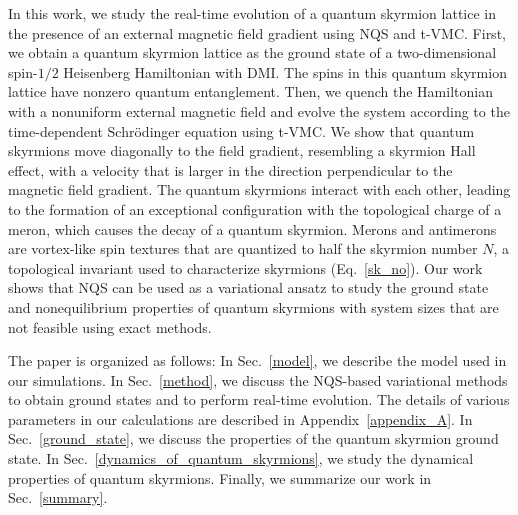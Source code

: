 \documentclass[aps,prb,twocolumn,superscriptaddress,a4paper,longbibliography]{revtex4-2}
\begin{document}
In this work, we study the real-time evolution of a quantum skyrmion lattice in the presence of an external magnetic field gradient using NQS and t-VMC. First, we obtain a quantum skyrmion lattice as the ground state of a two-dimensional spin-$1/2$ Heisenberg Hamiltonian with DMI. The spins in this quantum skyrmion lattice have nonzero quantum entanglement. Then, we quench the Hamiltonian with a nonuniform external magnetic field and evolve the system according to the time-dependent Schr{\"o}dinger equation using t-VMC. We show that quantum skyrmions move diagonally to the field gradient, resembling a skyrmion Hall effect, with a velocity that is larger in the direction perpendicular to the magnetic field gradient. 
The quantum skyrmions interact with each other, leading to the formation of an exceptional configuration with the topological charge of a meron, which causes the decay of a quantum skyrmion. Merons and antimerons are vortex-like spin textures that are quantized to half the skyrmion number $N$, a topological invariant used to characterize skyrmions (Eq.~\eqref{sk_no}).
Our work shows that NQS can be used as a variational ansatz to study the ground state and nonequilibrium properties of quantum skyrmions with system sizes that are not feasible using exact methods.

The paper is organized as follows: In Sec.~\ref{model}, we describe the model used in our simulations. In Sec.~\ref{method}, we discuss the NQS-based variational methods to obtain ground states and to perform real-time evolution. The details of various parameters in our calculations are described in Appendix~\ref{appendix_A}. In Sec.~\ref{ground_state}, we discuss the properties of the quantum skyrmion ground state. In Sec.~\ref{dynamics_of_quantum_skyrmions}, we study the dynamical properties of quantum skyrmions. Finally, we summarize our work in Sec.~\ref{summary}.
\end{document}
